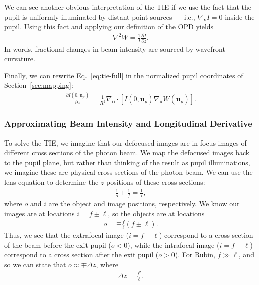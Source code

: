 \documentclass[TS,authoryear,toc]{lsstdoc}
\begin{document}
We can see another obvious interpretation of the TIE if we use the fact that the pupil is uniformly illuminated by distant point sources --- i.e., $\nabla_\mathbf{x} I = 0$ inside the pupil.
Using this fact and applying our definition of the OPD yields
\begin{align}
    \nabla^2 W = \frac{1}{I} \frac{\partial I}{\partial z}.
\end{align}
In words, fractional changes in beam intensity are sourced by wavefront curvature. 

Finally, we can rewrite Eq.~\ref{eq:tie-full} in the normalized pupil coordinates of Section~\ref{sec:mapping}:
\begin{align}
    \frac{\partial I(0, \mathbf{u}_p)}{\partial z} = 
    \frac{1}{R^2} \nabla_\mathbf{u} \cdot [I(0, \mathbf{u}_p) \nabla_\mathbf{u} W(\mathbf{u}_p)].
\end{align}


\subsubsection{Approximating Beam Intensity and Longitudinal Derivative}
\label{sec:approx-I-dIdz}

To solve the TIE, we imagine that our defocused images are in-focus images of different cross sections of the photon beam.
We map the defocused images back to the pupil plane, but rather than thinking of the result as pupil illuminations, we imagine these are physical cross sections of the photon beam.
We can use the lens equation to determine the $z$ positions of these cross sections:
\begin{align}
    \frac{1}{o} + \frac{1}{f} = \frac{1}{i},
\end{align}
where $o$ and $i$ are the object and image positions, respectively.
We know our images are at locations $i = f \pm \ell$, so the objects are at locations
\begin{align}
    o = \mp \frac{f}{\ell}(f \pm \ell).
\end{align}
Thus, we see that the extrafocal image ($i = f + \ell$) correspond to a cross section of the beam before the exit pupil ($o<0$), while the intrafocal image ($i = f - \ell$) correspond to a cross section after the exit pupil ($o>0$).
For Rubin, $f \gg \ell$, and so we can state that $o \approx \mp \Delta z$, where
\begin{align}
    \Delta z = \frac{f^2}{\ell}.
\end{align}
\end{document}
